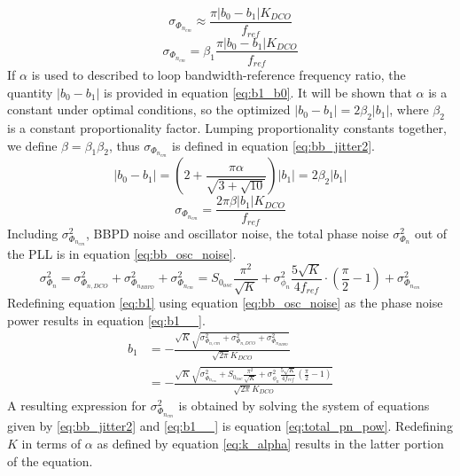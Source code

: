 		\begin{equation}\label{eq:bb_jitter}
			\sigma_{\Phi_{n_{em}}} \approx \frac{\pi|b_0-b_1|K_{DCO}}{f_{ref}}
		\end{equation}
		\begin{equation}\label{eq:bb_jitter_}
			\sigma_{\Phi_{n_{em}}} = \beta_1\frac{\pi|b_0-b_1|K_{DCO}}{f_{ref}}
		\end{equation}
	If $\alpha$ is used to described to loop bandwidth-reference frequency ratio, the quantity $|b_0-b_1|$ is provided in equation \ref{eq:b1_b0}. It will be shown that $\alpha$ is a constant under optimal conditions, so the optimized $|b_0-b_1| = 2\beta_2|b_1|$, where $\beta_2$ is a constant proportionality factor. Lumping proportionality constants together, we define $\beta = \beta_1\beta_2$, thus $\sigma_{\Phi_{n_{em}}}$ is defined in equation \ref{eq:bb_jitter2}.
	\begin{equation}\label{eq:b1_b0}
			|b_0-b_1| = \left(2 + \frac{\pi \alpha}{\sqrt{3+\sqrt{10}}}\right)|b_1| = 2\beta_2|b_1|
	\end{equation}
	\begin{equation}\label{eq:bb_jitter2}
		\sigma_{\Phi_{n_{em}}} = \frac{2\pi \beta |b_1|K_{DCO}}{f_{ref}}
	\end{equation}	
	Including $\sigma^2_{\Phi_{n_{em}}}$, BBPD noise and oscillator noise, the total phase noise $\sigma^2_{\Phi_{n}}$ out of the PLL is in equation \ref{eq:bb_osc_noise}.
	\begin{equation}\label{eq:bb_osc_noise}
		\sigma_{\Phi_{n}}^2 = \sigma_{\Phi_{n,DCO}}^2 + \sigma^2_{\Phi_{n_{BBPD}}} + \sigma^2_{\Phi_{n_{em}}} = S_{0_{osc}}\frac{\pi^2}{\sqrt{K}} + \sigma^2_{\phi_n}\frac{5\sqrt{K}}{4f_{ref}}\cdot\left(\frac{\pi}{2}-1\right)  + \sigma^2_{\Phi_{n_{em}}}
	\end{equation}
	Redefining equation \ref{eq:b1} using equation \ref{eq:bb_osc_noise} as the phase noise power results in equation \ref{eq:b1__}.
		\begin{align}\label{eq:b1__}
			 b_1 &=  - \frac{\sqrt{K}\sqrt{\sigma_{\Phi_{n,em}}^2 + \sigma_{\Phi_{n,DCO}}^2 + \sigma^2_{\Phi_{n_{BBPD}}} }}{\sqrt{2\pi}K_{DCO}} \\
			 & = - \frac{\sqrt{K}\sqrt{ \sigma^2_{\Phi_{n_{em}}} +  S_{0_{osc}}\frac{\pi^2}{\sqrt{K}} + \sigma^2_{\phi_n}\frac{5\sqrt{K}}{4f_{ref}}\left(\frac{\pi}{2}-1\right)}  }{\sqrt{2\pi}K_{DCO}}
		\end{align}
	A resulting expression for $\sigma^2_{\Phi_{n_{em}}}$ is obtained by solving the system of equations given by \ref{eq:bb_jitter2} and \ref{eq:b1__} is equation \ref{eq:total_pn_pow}. Redefining $K$ in terms of $\alpha$ as defined by equation \ref{eq:k_alpha} results in the latter portion of the equation.
